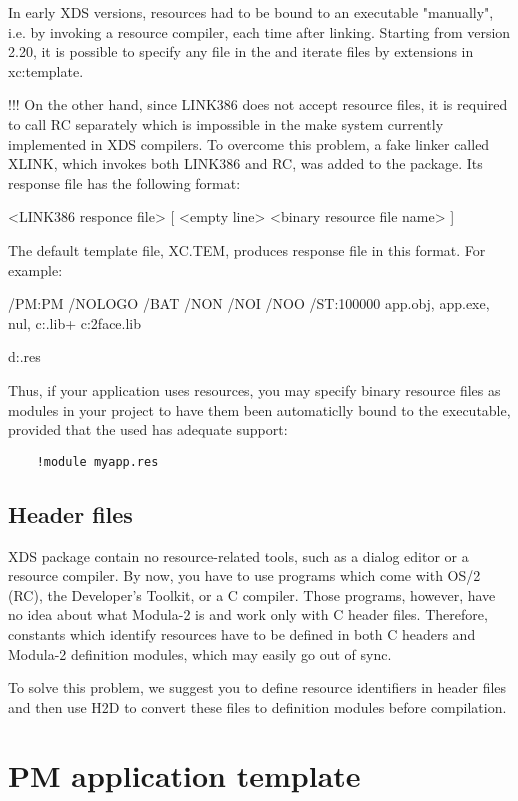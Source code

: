 In early XDS versions, resources had to be bound to an executable
"manually", i.e. by invoking a resource compiler, each time after linking.
Starting from version 2.20, it is possible to specify any file in
the 
and iterate files by extensions in 
{}{xc:template}.

\ifcomment !!!
On the other hand, since LINK386 does not accept resource files,
it is required to call RC separately which is impossible in the
make system currently implemented in XDS compilers. To overcome
this problem, a fake linker called XLINK, which invokes both
LINK386 and RC, was added to the package. Its response file has
the following format:

    <LINK386 responce file> [
    <empty line>
    { <binary resource file name> } ]

The default template file, XC.TEM, produces response file in this
format. For example:

    /PM:PM /NOLOGO /BAT /NON /NOI /NOO /ST:100000 app.obj,
    app.exe,
    nul,
    c:\xds\lib{}\libxds.lib+
    c:\xds\lib{}\os2face.lib

    d:\work\app.res
\fi

Thus, if your application uses resources, you may specify
binary resource files as modules in your project to have them
been automaticlly bound to the executable, provided that
the used  has adequate support:

\verb'    !module myapp.res'

\subsection{Header files}

XDS package contain no resource-related tools, such
as a dialog editor or a resource compiler. By now, you have to use
programs which come with OS/2 (RC), the Developer's Toolkit, or a
C compiler. Those programs, however, have no idea about what
Modula-2 is and work only with C header files. Therefore,
constants which identify resources have to be defined in
both C headers and Modula-2 definition modules, which may
easily go out of sync.

To solve this problem, we suggest you to define resource
identifiers in header files and then use H2D to convert these
files to definition modules before compilation.

\section{PM application template}

